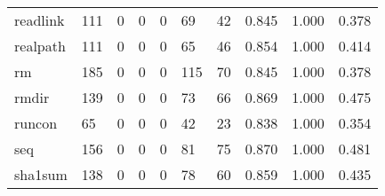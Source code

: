 \begin{longtable}{lp{2.0cm}p{2.0cm}p{2.0cm}p{2.0cm}p{2.0cm}p{2.0cm}p{2.0cm}p{2.0cm}p{2.0cm}}
readlink  &                    111 &                                             0 &                                            0 &                                           0 &                                           69 &                                         42 &                                0.845 &                                  1.000 &                                0.378 \\
realpath  &                    111 &                                             0 &                                            0 &                                           0 &                                           65 &                                         46 &                                0.854 &                                  1.000 &                                0.414 \\
rm        &                    185 &                                             0 &                                            0 &                                           0 &                                          115 &                                         70 &                                0.845 &                                  1.000 &                                0.378 \\
rmdir     &                    139 &                                             0 &                                            0 &                                           0 &                                           73 &                                         66 &                                0.869 &                                  1.000 &                                0.475 \\
runcon    &                     65 &                                             0 &                                            0 &                                           0 &                                           42 &                                         23 &                                0.838 &                                  1.000 &                                0.354 \\
seq       &                    156 &                                             0 &                                            0 &                                           0 &                                           81 &                                         75 &                                0.870 &                                  1.000 &                                0.481 \\
sha1sum   &                    138 &                                             0 &                                            0 &                                           0 &                                           78 &                                         60 &                                0.859 &                                  1.000 &                                0.435 \\

\end{longtable}
